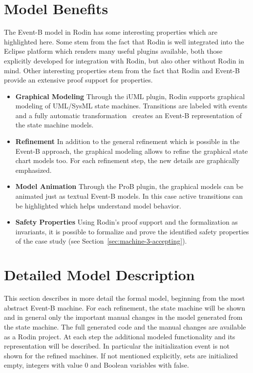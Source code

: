 \documentclass{template/openetcs_article}
\begin{document}
\section{Model Benefits}
\label{sec:model-highlights}

The Event-B model in Rodin has some interesting properties which are highlighted
here. Some stem from the fact that Rodin is well integrated into the Eclipse
platform which renders many useful plugins available, both those explicitly
developed for integration with Rodin, but also other without Rodin in mind.
Other interesting properties stem from the fact that Rodin and Event-B provide
an extensive proof support for properties.

\begin{itemize}
\item {\bf Graphical Modeling} Through the iUML plugin, Rodin supports graphical
  modeling of UML/SysML state machines. Transitions are labeled with events and
  a fully automatic transformation~\cite{said2009language} creates an Event-B
  representation of the state machine models.
\item {\bf Refinement} In addition to the general refinement which is possible
  in the Event-B approach, the graphical modeling allows to refine the graphical
  state chart models too. For each refinement step, the new details are
  graphically emphasized.
\item {\bf Model Animation} Through the ProB plugin, the graphical models can be
  animated just as textual Event-B models. In this case active transitions can
  be highlighted which helps understand model behavior.
\item {\bf Safety Properties} Using Rodin's proof support and the formalization
  as invariants, it is possible to formalize and prove the identified safety
  properties of the case study (see Section~\ref{sec:machine-3-accepting}).
\end{itemize}

\section{Detailed Model Description}
\label{sec:deta-model-descr}

This section describes in more detail the formal model, beginning from the most
abstract Event-B machine.  For each refinement, the state machine will be shown
and in general only the important manual changes in the model generated from the
state machine. The full generated code and the manual changes are available as a
Rodin project. At each step the additional modeled functionality and its
representation will be described. In particular the initialization event is not
shown for the refined machines. If not mentioned explicitly, sets are
initialized empty, integers with value 0 and Boolean variables with false.
\end{document}
